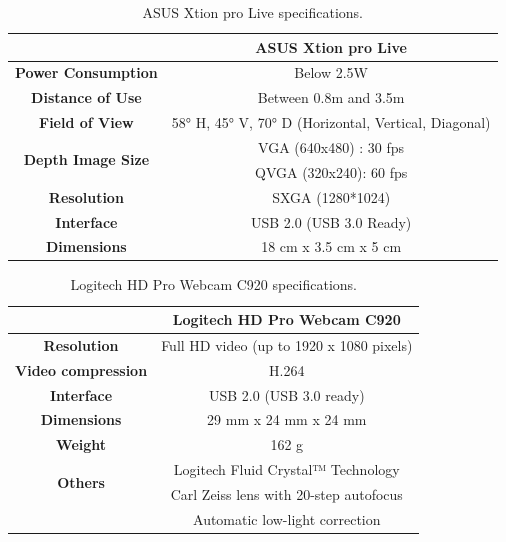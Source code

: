 \begin{table}[h!]
\begin{center}
\begin{tabular}{|c|c|}
\hline
& \bf{ASUS Xtion pro Live} \\
\hline \bf{ Power Consumption } & Below 2.5W \\
\hline \bf{ Distance of Use } & Between 0.8m and 3.5m \\
\hline \bf{ Field of View } & 58° H, 45° V, 70° D (Horizontal, Vertical, Diagonal) \\
\hline \multirow{2}{*}{\bf{ Depth Image Size }} 
& VGA (640x480) : 30 fps\\
& QVGA (320x240): 60 fps \\
\hline \bf{ Resolution } & SXGA (1280*1024)  \\
\hline \bf{ Interface } & USB 2.0 (USB 3.0 Ready) \\
\hline \bf{ Dimensions } & 18 cm x 3.5 cm x 5 cm \\
\hline
\end{tabular}
\end{center}
\caption{ASUS Xtion pro Live specifications.}
\end{table}

\begin{table}[h!]
\begin{center}
\begin{tabular}{|c|c|}
\hline
& \bf{Logitech HD Pro Webcam C920} \\
\hline \bf{Resolution } & Full HD video (up to 1920 x 1080 pixels) \\
\hline \bf{Video compression } & H.264 \\ 
\hline \bf{Interface } & USB 2.0 (USB 3.0 ready) \\
\hline \bf{Dimensions } & 29 mm x 24 mm x 24 mm \\ 
\hline \bf{Weight } & 162 g \\
\hline \multirow{2}{*}{\bf{Others}}
& Logitech Fluid Crystal™ Technology \\
& Carl Zeiss lens with 20-step autofocus \\
& Automatic low-light correction \\
\hline
\end{tabular}
\end{center}
\caption{Logitech HD Pro Webcam C920 specifications.}
\end{table}

